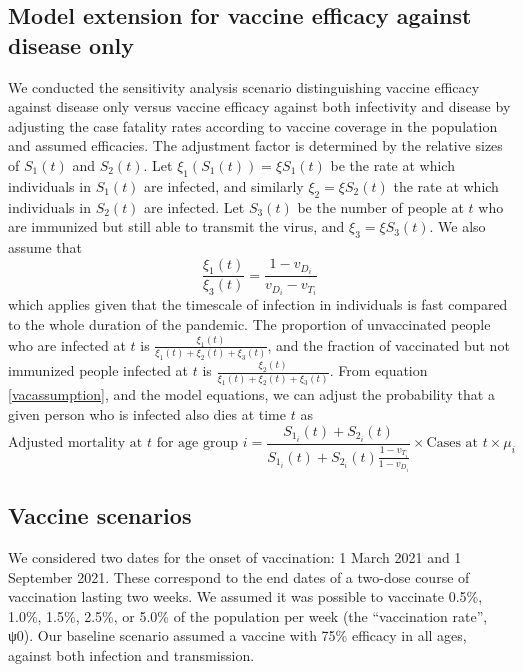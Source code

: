 \subsection{Model extension for vaccine efficacy against disease only}
\label{mortality_adjust}
We conducted the sensitivity analysis scenario distinguishing vaccine efficacy against disease only versus vaccine efficacy against both infectivity and disease by adjusting the case fatality rates according to vaccine coverage in the population and assumed efficacies. The adjustment factor is determined by the relative sizes of $S_1(t)$ and $S_2(t)$. Let $\xi_1 (S_1(t)) = \xi S_1(t)$ be the rate at which individuals in $S_1(t)$ are infected, and similarly $\xi_2 = \xi S_2(t)$ the rate at which individuals in $S_2(t)$ are infected. Let $S_3(t)$ be the number of people at $t$ who are immunized but still able to transmit the virus, and $\xi_3 = \xi S_3(t)$. We also assume that
\begin{equation}
   \frac{\xi_1(t)}{\xi_3(t)} = \frac{1 - v_{D_i}}{v_{D_i} - v_{T_i}}
   \label{vacassumption}
\end{equation}
which applies given that the timescale of infection in individuals is fast compared to the whole duration of the pandemic. The proportion of unvaccinated people who are infected at $t$ is $\frac{\xi_1(t)}{\xi_1(t) + \xi_2(t) + \xi_3(t)}$, and the fraction of vaccinated but not immunized people infected at $t$ is $\frac{\xi_2(t)}{\xi_1(t) + \xi_2(t) + \xi_3(t)}$. From equation \ref{vacassumption}, and the model equations, we can adjust the probability that a given person who is infected also dies at time $t$ as
\begin{equation}
    \textrm{Adjusted mortality at } t  \textrm{ for age group } i = \frac{S_{1_i}(t) + S_{2_i}(t)}{S_{1_i}(t) + S_{2_i}(t)\frac{1 - v_{T_i}}{1 - v_{D_i}}} \times \textrm{Cases at }t \times \mu_i
    \label{CFR_adjust}
\end{equation}

\subsection{Vaccine scenarios} 

We considered two dates for the onset of vaccination: 1 March 2021 and 1 September 2021. These correspond to the end dates of a two-dose course of vaccination lasting two weeks. We assumed it was possible to vaccinate 0.5\%, 1.0\%, 1.5\%, 2.5\%, or 5.0\% of the population per week (the “vaccination rate”, ψ0).  Our baseline scenario assumed a vaccine with 75\% efficacy in all ages, against both infection and transmission.  

